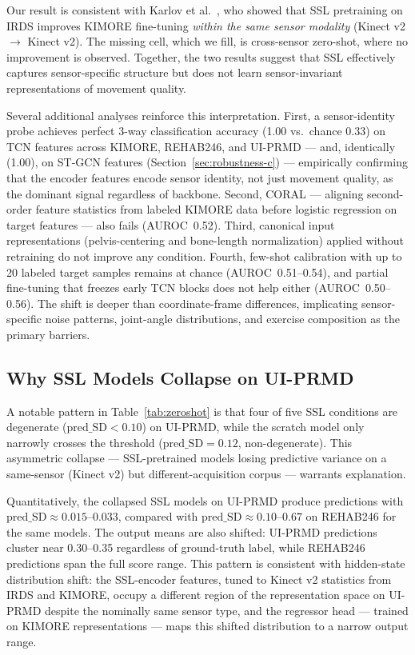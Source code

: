 \documentclass[10pt,journal]{IEEEtran}
\begin{document}
Our result is consistent with Karlov et al.\ \cite{karlov2024}, who showed that SSL pretraining on IRDS improves KIMORE fine-tuning \emph{within the same sensor modality} (Kinect v2 $\to$ Kinect v2). The missing cell, which we fill, is cross-sensor zero-shot, where no improvement is observed. Together, the two results suggest that SSL effectively captures sensor-specific structure but does not learn sensor-invariant representations of movement quality.

Several additional analyses reinforce this interpretation. First, a sensor-identity probe achieves perfect 3-way classification accuracy (1.00 vs.\ chance 0.33) on TCN features across KIMORE, REHAB246, and UI-PRMD --- and, identically (1.00), on ST-GCN features (Section~\ref{sec:robustness-c}) --- empirically confirming that the encoder features encode sensor identity, not just movement quality, as the dominant signal regardless of backbone. Second, CORAL \cite{sun2016deep} --- aligning second-order feature statistics from labeled KIMORE data before logistic regression on target features --- also fails (AUROC~0.52). Third, canonical input representations (pelvis-centering and bone-length normalization) applied without retraining do not improve any condition. Fourth, few-shot calibration with up to 20 labeled target samples remains at chance (AUROC~0.51--0.54), and partial fine-tuning that freezes early TCN blocks does not help either (AUROC~0.50--0.56). The shift is deeper than coordinate-frame differences, implicating sensor-specific noise patterns, joint-angle distributions, and exercise composition as the primary barriers.

\subsection{Why SSL Models Collapse on UI-PRMD}
\label{sec:collapse}

A notable pattern in Table~\ref{tab:zeroshot} is that four of five SSL conditions are degenerate ($\text{pred\_SD} < 0.10$) on UI-PRMD, while the scratch model only narrowly crosses the threshold ($\text{pred\_SD}=0.12$, non-degenerate). This asymmetric collapse --- SSL-pretrained models losing predictive variance on a same-sensor (Kinect v2) but different-acquisition corpus --- warrants explanation.

Quantitatively, the collapsed SSL models on UI-PRMD produce predictions with $\text{pred\_SD} \approx 0.015$--$0.033$, compared with $\text{pred\_SD} \approx 0.10$--$0.67$ on REHAB246 for the same models. The output means are also shifted: UI-PRMD predictions cluster near 0.30--0.35 regardless of ground-truth label, while REHAB246 predictions span the full score range. This pattern is consistent with hidden-state distribution shift: the SSL-encoder features, tuned to Kinect v2 statistics from IRDS and KIMORE, occupy a different region of the representation space on UI-PRMD despite the nominally same sensor type, and the regressor head --- trained on KIMORE representations --- maps this shifted distribution to a narrow output range.
\end{document}
